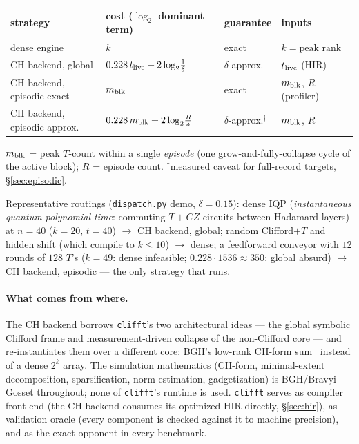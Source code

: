 \documentclass[11pt]{article}
\begin{document}
\begin{center}\small
\begin{tabular}{llll}
\toprule
strategy & cost ($\log_2$ dominant term) & guarantee & inputs \\
\midrule
dense engine & $k$ & exact & $k=\mathrm{peak\_rank}$ \\
CH backend, global & $0.228\,t_{\rm live} + 2\log_2\!\frac1\delta$ & $\delta$-approx.\ & $t_{\rm live}$ (HIR) \\
CH backend, episodic-exact & $m_{\rm blk}$ & exact & $m_{\rm blk}$, $R$ (profiler) \\
CH backend, episodic-approx.\ & $0.228\,m_{\rm blk} + 2\log_2\!\frac{R}{\delta}$ & $\delta$-approx.$^\dagger$ & $m_{\rm blk}$, $R$ \\
\bottomrule
\end{tabular}
\end{center}
{\small $m_{\rm blk}$ = peak $T$-count within a single \emph{episode} (one
grow-and-fully-collapse cycle of the active block); $R$ = episode count.
$^\dagger$measured caveat for full-record targets, \S\ref{sec:episodic}.}

Representative routings (\texttt{dispatch.py} demo, $\delta{=}0.15$): dense
IQP (\emph{instantaneous quantum polynomial-time}: commuting $T{+}CZ$
circuits between Hadamard layers) at $n{=}40$ ($k{=}20$, $t{=}40$) $\to$ CH
backend, global; random Clifford$+T$ and hidden shift (which compile to
$k\le10$) $\to$ dense; a feedforward conveyor with $12$ rounds of $128$
$T$'s ($k{=}49$: dense infeasible; $0.228\cdot1536\approx350$: global
absurd) $\to$ CH backend, episodic --- the only strategy that runs.

\paragraph{What comes from where.} The CH backend borrows \texttt{clifft}'s two
architectural ideas --- the global symbolic Clifford frame and
measurement-driven collapse of the non-Clifford core --- and re-instantiates
them over a different core: BGH's low-rank CH-form sum~\cite{bravyi2019}
instead of a dense $2^k$ array. The simulation mathematics (CH-form,
minimal-extent decomposition, sparsification, norm estimation, gadgetization)
is BGH/Bravyi--Gosset throughout; none of \texttt{clifft}'s runtime is used.
\texttt{clifft} serves as compiler front-end (the CH backend consumes its
optimized HIR directly, \S\ref{sec:hir}), as validation oracle (every
component is checked against it to machine precision), and as the exact
opponent in every benchmark.
\end{document}
